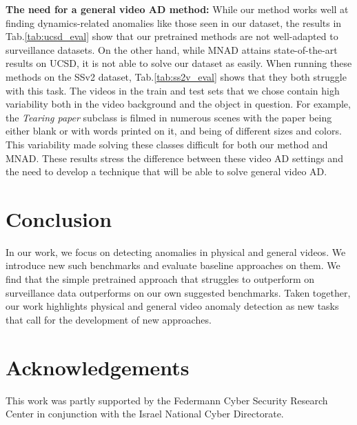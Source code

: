 \documentclass{article}
\begin{document}
\textbf{The need for a general video AD method:} While our method works well at finding dynamics-related anomalies like those seen in our dataset, the results in Tab.\ref{tab:ucsd_eval} show that our pretrained methods are not well-adapted to surveillance datasets. On the other hand, while MNAD attains state-of-the-art results on UCSD, it is not able to solve our dataset as easily. When running these methods on the SSv2 dataset,  Tab.\ref{tab:ss2v_eval} shows that they both struggle with this task. The videos in the train and test sets that we chose contain high variability both in the video background and the object in question. For example, the \textit{Tearing paper} subclass is filmed in numerous scenes with the paper being either blank or with words printed on it, and being of different sizes and colors. This variability made solving these classes difficult for both our method and MNAD. These results stress the difference between these video AD settings and the need to develop a technique that will be able to solve general video AD. 





\section{Conclusion}
In our work, we focus on detecting anomalies in physical and general videos. We introduce new such benchmarks and evaluate baseline approaches on them. We find that the simple pretrained approach that struggles to outperform on surveillance data outperforms on our own suggested benchmarks. Taken together, our work highlights physical and general video anomaly detection as new tasks that call for the development of new approaches.


\section{Acknowledgements}

This work was partly supported by the Federmann Cyber Security Research Center in conjunction with the Israel National Cyber Directorate.



\end{document}
